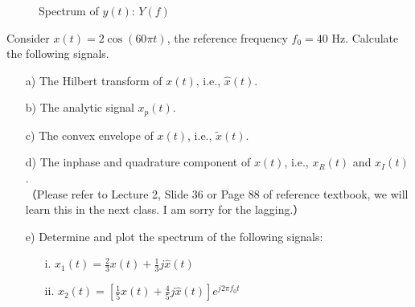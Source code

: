 \documentclass{assignment}
\begin{document}
\begin{sol}
\begin{itemize}
\begin{figure}[h]
            \caption{Spectrum of $y(t)$: $Y(f)$}
            \label{6}
        \end{figure}
    \end{itemize}
\end{sol}

\begin{prob}
    Consider $x(t)=2\cos(60\pi t)$, the reference frequency $f_0=40$ Hz. Calculate the following signals.
    \begin{itemize}
        \item[a)] The Hilbert transform of $x(t)$, i.e., $\hat{x}(t)$.
        \item[b)] The analytic signal $x_p(t)$.
        \item[c)] The convex envelope of $x(t)$, i.e., $\tilde{x}(t)$.
        \item[d)] The inphase and quadrature component of $x(t)$, i.e., $x_R(t)$ and $x_I(t)$.\\
        （Please refer to Lecture 2, Slide 36 or Page 88 of reference textbook, we will learn this in the next class. I am sorry for the lagging.）
        \item[e)] Determine and plot the spectrum of the following signals:
        \begin{itemize}
            \item[i.] $x_1(t)=\frac{2}{3}x(t)+\frac{1}{3}j\hat{x}(t)$
            \item[ii.] $x_2(t)=\left[\frac{1}{5}x(t)+\frac{4}{5}j\hat{x}(t)\right]e^{j2\pi f_0t}$
        \end{itemize}
    \end{itemize}
\end{prob}
\begin{sol}

\end{sol}
\end{document}
